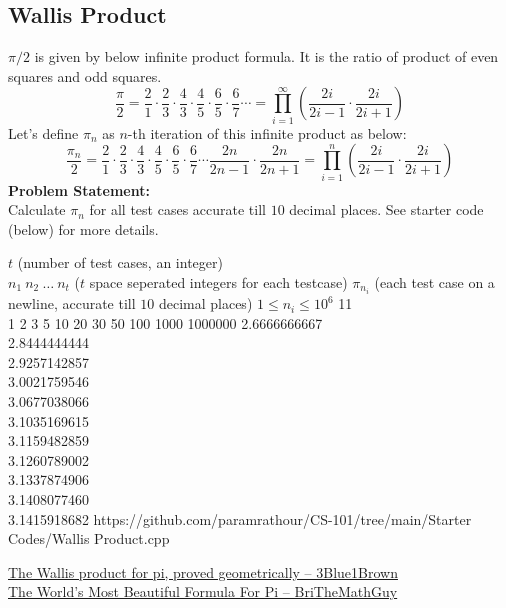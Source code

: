 \documentclass[../../Problems]{subfiles}
\begin{document}
\subsection{Wallis Product}{\label{pp:wallis}}
$\pi/2$ is given by below infinite product formula. It is the ratio of product of even squares and odd squares.
\begin{equation}
\frac{\pi}{2} = {\frac {2}{1}}\cdot {\frac {2}{3}}\cdot {\frac {4}{3}}\cdot {\frac {4}{5}}\cdot {\frac {6}{5}}\cdot {\frac {6}{7}}\cdots= \prod _{i=1}^{\infty}\left({\frac {2i}{2i-1}}\cdot {\frac {2i}{2i+1}}\right)
\end{equation}
Let's define $\pi_n$ as $n$-th iteration of this infinite product as below:
\begin{equation*}
\frac{\pi_n}{2} = {\frac {2}{1}}\cdot {\frac {2}{3}}\cdot {\frac {4}{3}}\cdot {\frac {4}{5}}\cdot {\frac {6}{5}}\cdot {\frac {6}{7}}\cdots{\frac {2n}{2n-1}}\cdot {\frac {2n}{2n+1}} = \prod _{i=1}^{n}\left({\frac {2i}{2i-1}}\cdot {\frac {2i}{2i+1}}\right)
\end{equation*}
\textbf{Problem Statement:}\\
Calculate $\pi_n$ for all test cases accurate till $10$ decimal places. See starter code (below) for more details.
\begin{testcases}
	{$t$ \hfill(number of test cases, an integer)\\$n_1\ n_2\ \ldots\ n_t$ \hfill($t$ space seperated integers for each testcase)}
	{$\pi_{n_i}$ \hfill(each test case on a newline, accurate till $10$ decimal places)}
	{$1 \leq n_i \leq 10^{6}$}
	{11\\1 2 3 5 10 20 30 50 100 1000 1000000}
	{2.6666666667\\2.8444444444\\2.9257142857\\3.0021759546\\3.0677038066\\3.1035169615\\3.1159482859\\3.1260789002\\3.1337874906\\3.1408077460\\3.1415918682}
	{https://github.com/paramrathour/CS-101/tree/main/Starter Codes/Wallis Product.cpp}
\end{testcases}
\begin{funvideo}
\href{https://youtu.be/8GPy_UMV-08}{The Wallis product for pi, proved geometrically -- 3Blue1Brown}\\
\href{https://youtu.be/k9nRlMDbefc}{The World's Most Beautiful Formula For Pi -- BriTheMathGuy}
\end{funvideo}
\end{document}
